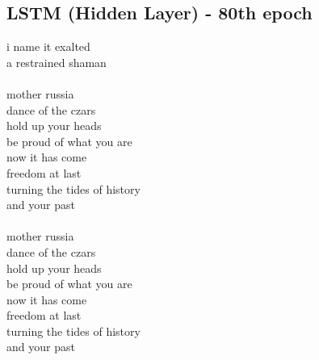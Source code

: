 \documentclass[conference]{IEEEtran}
\begin{document}
\subsection{LSTM (Hidden Layer) - 80th epoch}\label{HID80}
i name it exalted \\
a restrained shaman \\
\\
mother russia \\
dance of the czars \\
hold up your heads \\
be proud of what you are \\
now it has come \\
freedom at last \\
turning the tides of history \\
and your past \\
\\
mother russia \\
dance of the czars \\
hold up your heads \\
be proud of what you are \\
now it has come \\
freedom at last \\
turning the tides of history \\
and your past \\
\end{document}
